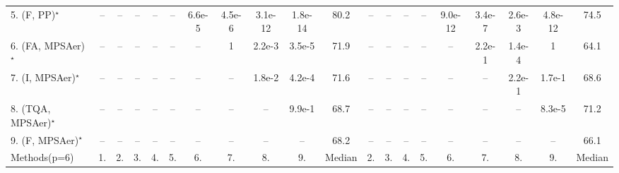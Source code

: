 \begin{table}[ht]
{\begin{tabular}{l|cccccccccc|ccccccccc|}
5. (F, PP)$^\star$ & -- & -- & -- & -- & -- & {\cellcolor[HTML]{00441B}} \color[HTML]{F1F1F1} 6.6e-5 & {\cellcolor[HTML]{00441B}} \color[HTML]{F1F1F1} 4.5e-6 & {\cellcolor[HTML]{00441B}} \color[HTML]{F1F1F1} 3.1e-12 & {\cellcolor[HTML]{00441B}} \color[HTML]{F1F1F1} 1.8e-14 & 80.2 & -- & -- & -- & -- & {\cellcolor[HTML]{00441B}} \color[HTML]{F1F1F1} 9.0e-12 & {\cellcolor[HTML]{00441B}} \color[HTML]{F1F1F1} 3.4e-7 & {\cellcolor[HTML]{309950}} \color[HTML]{F1F1F1} 2.6e-3 & {\cellcolor[HTML]{00441B}} \color[HTML]{F1F1F1} 4.8e-12 & 74.5 \\
6. (FA, MPSAer)$^\star$ & -- & -- & -- & -- & -- & -- & 1 & {\cellcolor[HTML]{309950}} \color[HTML]{F1F1F1} 2.2e-3 & {\cellcolor[HTML]{00441B}} \color[HTML]{F1F1F1} 3.5e-5 & 71.9 & -- & -- & -- & -- & -- & 2.2e-1 & {\cellcolor[HTML]{00441B}} \color[HTML]{F1F1F1} 1.4e-4 & 1 & 64.1 \\
7. (I, MPSAer)$^\star$ & -- & -- & -- & -- & -- & -- & -- & {\cellcolor[HTML]{B5E1AE}} \color[HTML]{000000} 1.8e-2 & {\cellcolor[HTML]{00441B}} \color[HTML]{F1F1F1} 4.2e-4 & 71.6 & -- & -- & -- & -- & -- & -- & 2.2e-1 & 1.7e-1 & 68.6 \\
8. (TQA, MPSAer)$^\star$ & -- & -- & -- & -- & -- & -- & -- & -- & 9.9e-1 & 68.7 & -- & -- & -- & -- & -- & -- & -- & {\cellcolor[HTML]{00441B}} \color[HTML]{F1F1F1} 8.3e-5 & 71.2 \\
9. (F, MPSAer)$^\star$ & -- & -- & -- & -- & -- & -- & -- & -- & -- & 68.2 & -- & -- & -- & -- & -- & -- & -- & -- & 66.1 \\
\hline

Methods(p=6) & 1. & 2. & 3. & 4. & 5. & 6. & 7. & 8. & 9. & Median & 2. & 3. & 4. & 5. & 6. & 7. & 8. & 9. & Median \\
\hline


\end{tabular}}
\end{table}
